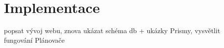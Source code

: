 \chapter{Implementace}

popsat vývoj webu, znova ukázat schéma db + ukázky Prismy, vysvětlit fungování Plánovače